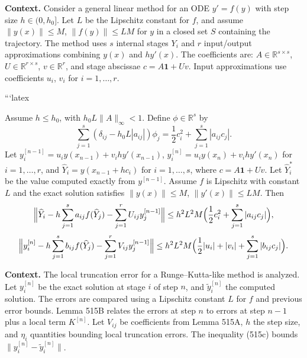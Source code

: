 \noindent\textbf{Context.}
Consider a general linear method for an ODE $y' = f(y)$ with step size $h \in (0, h_0]$. Let $L$ be the Lipschitz constant for $f$, and assume $\|y(x)\| \le M$, $\|f(y)\| \le LM$ for $y$ in a closed set $S$ containing the trajectory. The method uses $s$ internal stages $Y_i$ and $r$ input/output approximations combining $y(x)$ and $hy'(x)$. The coefficients are: $A \in \mathbb{R}^{s \times s}$, $U \in \mathbb{R}^{r \times s}$, $v \in \mathbb{R}^{r}$, and stage abscissae $c = A\mathbf{1} + U v$. Input approximations use coefficients $u_i$, $v_i$ for $i=1,\dots,r$.

```latex
\begin{lemma}

  \label{lem:515A}
Assume $h \le h_0$, with $h_0 L \|A\|_\infty < 1$. Define $\phi \in \mathbb{R}^s$ by
\[
\sum_{j=1}^s (\delta_{ij} - h_0 L|a_{ij}|)\phi_j = \frac12 c_i^2 + \sum_{j=1}^s |a_{ij}c_j|.
\]
Let $y_i^{[n-1]} = u_i y(x_{n-1}) + v_i h y'(x_{n-1})$, $y_i^{[n]} = u_i y(x_n) + v_i h y'(x_n)$ for $i=1,\dots,r$, and $\widehat Y_i = y(x_{n-1}+hc_i)$ for $i=1,\dots,s$, where $c = A\mathbf{1} + Uv$. Let $\widehat Y_i^\ast$ be the value computed exactly from $y^{[n-1]}$. Assume $f$ is Lipschitz with constant $L$ and the exact solution satisfies $\|y(x)\| \le M$, $\|y'(x)\| \le LM$. Then
\[
\Bigl\| \widehat Y_i - h\sum_{j=1}^s a_{ij} f(\widehat Y_j) - \sum_{j=1}^r U_{ij} y_j^{[n-1]} \Bigr\|
\le h^2 L^2 M \Bigl( \frac12 c_i^2 + \sum_{j=1}^s |a_{ij}c_j| \Bigr),
\]
\[
\Bigl\| y_i^{[n]} - h\sum_{j=1}^s b_{ij} f(\widehat Y_j) - \sum_{j=1}^r V_{ij} y_j^{[n-1]} \Bigr\|
\le h^2 L^2 M \Bigl( \frac12 |u_i| + |v_i| + \sum_{j=1}^s |b_{ij}c_j| \Bigr).
\]
\end{lemma}

\noindent\textbf{Context.}
The local truncation error for a Runge--Kutta-like method is analyzed. Let $y_i^{[n]}$ be the exact solution at stage $i$ of step $n$, and $\tilde{y}_i^{[n]}$ the computed solution. The errors are compared using a Lipschitz constant $L$ for $f$ and previous error bounds. Lemma 515B relates the errors at step $n$ to errors at step $n-1$ plus a local term $K^{[n]}$. Let $V_{ij}$ be coefficients from Lemma 515A, $h$ the step size, and $\eta_i$ quantities bounding local truncation errors. The inequality (515c) bounds $\|y_i^{[n]}-\tilde{y}_i^{[n]}\|$.

